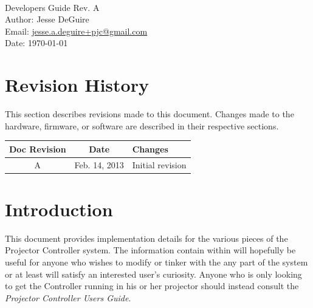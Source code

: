 \documentclass{article}
\newcommand{\docrev}{A}
\begin{document}
\frenchspacing

 \\
{\large Developers Guide} Rev. \docrev \\
Author: Jesse DeGuire \\
Email: \href{mailto:jesse.a.deguire+pjc@gmail.com}{jesse.a.deguire+pjc@gmail.com} \\
Date: \today \\

\tableofcontents

\let\stdsection\section
\renewcommand{\section}{\newpage\stdsection}

\setlength{\parskip}{8pt}



\section*{Revision History}
This section describes revisions made to this document.  Changes made to the hardware, firmware, or
software are described in their respective sections.

\begin{center}
    \begin{tabular}{c|c|p{}}
        Doc Revision & Date & Changes \\
        \hline
        A & Feb. 14, 2013 & Initial revision \\
    \end{tabular}
\end{center}

\section{Introduction}
This document provides implementation details for the various pieces of the Projector Controller
system.  The information contain within will hopefully be useful for anyone who wishes to modify or
tinker with the any part of the system or at least will satisfy an interested user's curiosity.
Anyone who is only looking to get the Controller running in his or her projector should instead
consult the \textit{Projector Controller Users Guide}.
\end{document}
